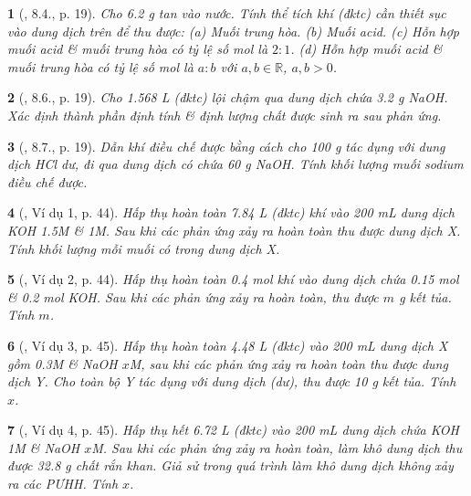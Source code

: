 \documentclass{article}
\newtheorem{baitoan}{}
\begin{document}
\begin{baitoan}[\cite{Truong_BTNC_Hoa_Hoc_9_2021}, 8.4., p. 19]
	Cho {\rm6.2 g } tan vào nước. Tính thể tích khí {\rm{}} (đktc) cần thiết sục vào dung dịch trên để thu được: (a) Muối trung hòa. (b) Muối acid. (c) Hỗn hợp muối acid \& muối trung hòa có tỷ lệ số mol là $2:1$. (d) Hỗn hợp muối acid \& muối trung hòa có tỷ lệ số mol là $a:b$ với $a,b\in\mathbb{R}$, $a,b > 0$.
\end{baitoan}

\begin{baitoan}[\cite{Truong_BTNC_Hoa_Hoc_9_2021}, 8.6., p. 19]
	Cho {\rm1.568 L } (đktc) lội chậm qua dung dịch chứa {\rm3.2 g NaOH}. Xác định thành phần định tính \& định lượng chất được sinh ra sau phản ứng.
\end{baitoan}

\begin{baitoan}[\cite{Truong_BTNC_Hoa_Hoc_9_2021}, 8.7., p. 19]
	Dẫn khí {\rm{}} điều chế được bằng cách cho {\rm100 g } tác dụng với dung dịch {\rm HCl} dư, đi qua dung dịch có chứa {\rm60 g NaOH}. Tính khối lượng muối sodium điều chế được.
\end{baitoan}

\begin{baitoan}[\cite{Truong_Long_Huong_bdhsg_Hoa_Hoc_9}, Ví dụ 1, p. 44]
	Hấp thụ hoàn toàn {\rm7.84 L} (đktc) khí {\rm{}} vào {\rm200 mL} dung dịch {\rm KOH 1.5M} \& {\rm{} 1M}. Sau khi các phản ứng xảy ra hoàn toàn thu được dung dịch X. Tính khối lượng mỗi muối có trong dung dịch X.
\end{baitoan}

\begin{baitoan}[\cite{Truong_Long_Huong_bdhsg_Hoa_Hoc_9}, Ví dụ 2, p. 44]
	Hấp thụ hoàn toàn {\rm0.4 mol} khí {\rm{}} vào dung dịch chứa {\rm0.15 mol } \& {\rm0.2 mol KOH}. Sau khi các phản ứng xảy ra hoàn toàn, thu được $m$ {\rm g} kết tủa. Tính $m$.
\end{baitoan}

\begin{baitoan}[\cite{Truong_Long_Huong_bdhsg_Hoa_Hoc_9}, Ví dụ 3, p. 45]
	Hấp thụ hoàn toàn {\rm4.48 L } (đktc) vào {\rm200 mL} dung dịch X gồm {\rm{} 0.3M \& NaOH $x$M}, sau khi các phản ứng xảy ra hoàn toàn thu được dung dịch Y. Cho toàn bộ Y tác dụng với dung dịch {\rm{}} (dư), thu được {\rm10 g} kết tủa. Tính $x$.
\end{baitoan}

\begin{baitoan}[\cite{Truong_Long_Huong_bdhsg_Hoa_Hoc_9}, Ví dụ 4, p. 45]
	Hấp thụ hết {\rm6.72 L } (đktc) vào {\rm200 mL} dung dịch chứa {\rm KOH 1M} \& {\rm NaOH $x$M}. Sau khi các phản ứng xảy ra hoàn toàn, làm khô dung dịch thu được {\rm32.8 g} chất rắn khan. Giả sử trong quá trình làm khô dung dịch không xảy ra các {\rm PƯHH}. Tính $x$.
\end{baitoan}
\end{document}
